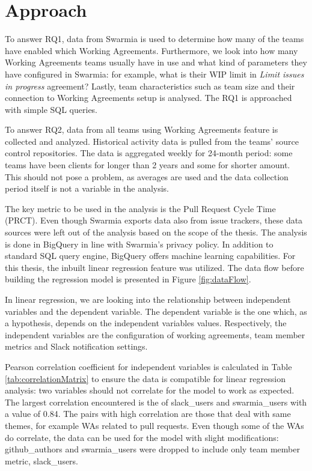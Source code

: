 \section{Approach}

To answer RQ1, data from Swarmia is used to determine how many of the teams have enabled which Working Agreements. Furthermore, we look into how many Working Agreements teams usually have in use and what kind of parameters they have configured in Swarmia: for example, what is their WIP limit in \textit{Limit issues in progress} agreement? Lastly, team characteristics such as team size and their connection to Working Agreements setup is analysed. The RQ1 is approached with simple SQL queries. 

To answer RQ2, data from all teams using Working Agreements feature is collected and analyzed. Historical activity data is pulled from the teams' source control repositories. The data is aggregated weekly for 24-month period: some teams have been clients for longer than 2 years and some for shorter amount. This should not pose a problem, as averages are used and the data collection period itself is not a variable in the analysis.

The key metric to be used in the analysis is the Pull Request Cycle Time (PRCT). Even though Swarmia exports data also from issue trackers, these data sources were left out of the analysis based on the scope of the thesis. The analysis is done in BigQuery in line with Swarmia's privacy policy. In addition to standard SQL query engine, BigQuery offers machine learning capabilities. For this thesis, the inbuilt linear regression feature was utilized. The data flow before building the regression model is presented in Figure \ref{fig:dataFlow}. 

In linear regression, we are looking into the relationship between independent variables and the dependent variable. The dependent variable is the one which, as a hypothesis, depends on the independent variables values. Respectively, the independent variables are the configuration of working agreements, team member metrics and Slack notification settings. 



Pearson correlation coefficient for independent variables is calculated in Table \ref{tab:correlationMatrix} to ensure the data is compatible for linear regression analysis: two variables should not correlate for the model to work as expected. The largest correlation encountered is the of slack\_users and swarmia\_users with a value of 0.84. The pairs with high correlation are those that deal with same themes, for example WAs related to pull requests. Even though some of the WAs do correlate, the data can be used for the model with slight modifications: github\_authors and swarmia\_users were dropped to include only team member metric, slack\_users. 

